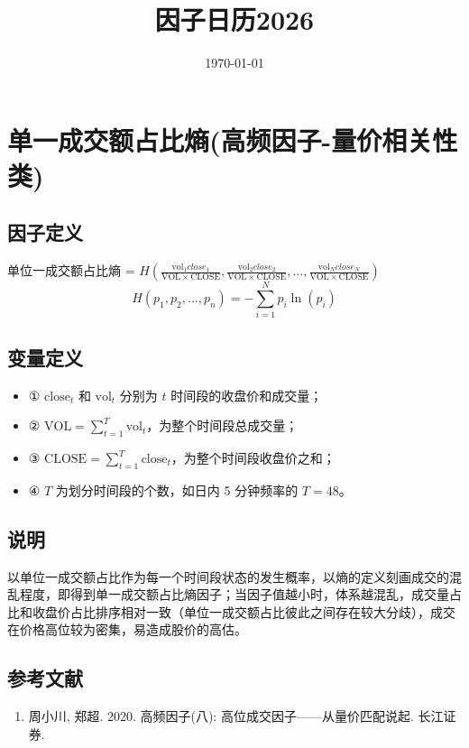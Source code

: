 \documentclass{article}
\title{因子日历2026}
\date{\today}
\begin{document}
\maketitle

\section{单一成交额占比熵(高频因子-量价相关性类)}

\subsection{因子定义}
单位一成交额占比熵 = \( H\left(\frac{\mathrm{vol}_1close_1 }{\mathrm{VOL} \times \mathrm{CLOSE}}, \frac{\mathrm{vol}_2close_2}{\mathrm{VOL} \times \mathrm{CLOSE}}, \dots, \frac{\mathrm{vol}_Nclose_N}{\mathrm{VOL} \times \mathrm{CLOSE}}\right) \)
\begin{equation}
    H(p_1, p_2, \dots, p_n) = -\sum_{i=1}^N p_i \ln(p_i)
\end{equation}

\subsection{变量定义}
\begin{itemize}
    \item ① \(\mathrm{close}_t\) 和 \(\mathrm{vol}_t\) 分别为 \(t\) 时间段的收盘价和成交量；
    \item ② \(\displaystyle \mathrm{VOL} = \sum_{t=1}^T \mathrm{vol}_t\)，为整个时间段总成交量；
    \item ③ \(\displaystyle \mathrm{CLOSE} = \sum_{t=1}^T \mathrm{close}_t\)，为整个时间段收盘价之和；
    \item ④ \(T\) 为划分时间段的个数，如日内 5 分钟频率的 \(T=48\)。
\end{itemize}

\subsection{说明}
以单位一成交额占比作为每一个时间段状态的发生概率，以熵的定义刻画成交的混乱程度，即得到单一成交额占比熵因子；当因子值越小时，体系越混乱，成交量占比和收盘价占比排序相对一致（单位一成交额占比彼此之间存在较大分歧），成交在价格高位较为密集，易造成股价的高估。

\subsection{参考文献}
\begin{enumerate}
    \item 周小川, 郑超. 2020. 高频因子(八): 高位成交因子——从量价匹配说起. 长江证券.
\end{enumerate}
\end{document}
